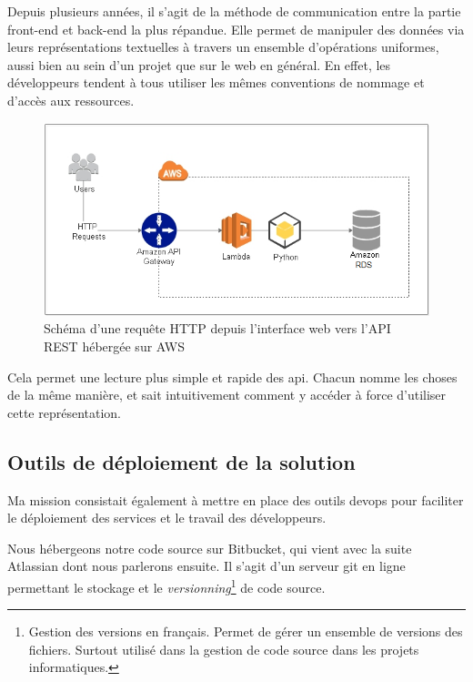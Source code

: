 Depuis plusieurs années, il s'agit de la méthode de communication entre la partie \gls{front-end} et \gls{back-end} la plus répandue. Elle permet de manipuler des données via leurs représentations textuelles à travers un ensemble d'opérations uniformes, aussi bien au sein d'un projet que sur le web en général. En effet, les développeurs tendent à tous utiliser les mêmes conventions de nommage et d'accès aux ressources.

  \begin{figure}[H]
    \centering
    \includegraphics[width=1\linewidth]{img/aws_api_gateway.png}
    \caption{Schéma d'une requête HTTP depuis l'interface web vers l'API REST hébergée sur AWS}
  \end{figure}

Cela permet une lecture plus simple et rapide des \gls{api}. Chacun nomme les choses de la même manière, et sait intuitivement comment y accéder à force d'utiliser cette représentation.

\newpage
\subsection{Outils de déploiement de la solution}


Ma mission consistait également à mettre en place des outils \gls{devops} pour faciliter le déploiement des services et le travail des développeurs.

Nous hébergeons notre code source sur Bitbucket\cite{noauthor_bitbucket_nodate}, qui vient avec la suite Atlassian dont nous parlerons ensuite. Il s'agit d'un serveur git en ligne permettant le stockage et le
\textit{versionning}\footnote{\og Gestion des versions \fg en français. Permet de gérer un ensemble de versions des fichiers. Surtout utilisé dans la gestion de code source dans les projets informatiques.}
de code source.

